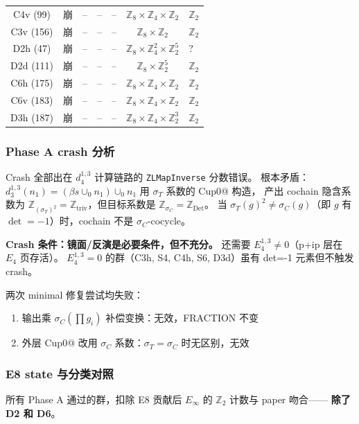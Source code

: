 \documentclass[a4paper,fontset=ubuntu,12pt]{ctexart}
\newcommand{\ZZ}{\mathbb{Z}}
\newcommand{\aT}{\sigma_T}
\newcommand{\aC}{\sigma_C}
\begin{document}
\begin{center}
\begin{tabular}{c|c|c|c|c|c|l}
C4v (99) & 崩 & -- & -- & -- & $\ZZ_8\times\ZZ_4\times\ZZ_2$ & $\ZZ_2$ \\
C3v (156) & 崩 & -- & -- & -- & $\ZZ_8\times\ZZ_2$ & $\ZZ_2$ \\
D2h (47) & 崩 & -- & -- & -- & $\ZZ_8\times\ZZ_4^2\times\ZZ_2^5$ & ? \\
D2d (111) & 崩 & -- & -- & -- & $\ZZ_8\times\ZZ_2^5$ & $\ZZ_2$ \\
C6h (175) & 崩 & -- & -- & -- & $\ZZ_8\times\ZZ_4\times\ZZ_2$ & $\ZZ_2$ \\
C6v (183) & 崩 & -- & -- & -- & $\ZZ_8\times\ZZ_4\times\ZZ_2$ & $\ZZ_2$ \\
D3h (187) & 崩 & -- & -- & -- & $\ZZ_8\times\ZZ_4\times\ZZ_2^3$ & $\ZZ_2$ \\
\hline
\end{tabular}
\end{center}

\subsubsection{Phase A crash 分析}

Crash 全部出在 $d_4^{1,3}$ 计算链路的 \texttt{ZLMapInverse} 分数错误。
根本矛盾：$d_3^{1,3}(n_1) = (\beta s \cup_0 n_1) \cup_0 n_1$ 用 $\aT$ 系数的 Cup0@ 构造，
产出 cochain 隐含系数为 $\ZZ_{(\aT)^2} = \ZZ_{\mathrm{triv}}$，但目标系数是 $\ZZ_{\aC} = \ZZ_{\mathrm{Det}}$。
当 $\aT(g)^2 \neq \aC(g)$（即 $g$ 有 $\det=-1$）时，cochain 不是 $\aC$-cocycle。

\textbf{Crash 条件：镜面/反演是必要条件，但不充分。} 还需要 $E_4^{1,3}\neq 0$（p+ip 层在 $E_4$ 页存活）。
$E_4^{1,3}=0$ 的群（C3h, S4, C4h, S6, D3d）虽有 det=-1 元素但不触发 crash。

两次 minimal 修复尝试均失败：
\begin{enumerate}
\item 输出乘 $\aC(\prod g_i)$ 补偿变换：无效，FRACTION 不变
\item 外层 Cup0@ 改用 $\aC$ 系数：$\aT=\aC$ 时无区别，无效
\end{enumerate}

\subsubsection{E8 state 与分类对照}

所有 Phase A 通过的群，扣除 E8 贡献后 $E_\infty$ 的 $\ZZ_2$ 计数与 paper 吻合——
\textbf{除了 D2 和 D6}。
\end{document}
